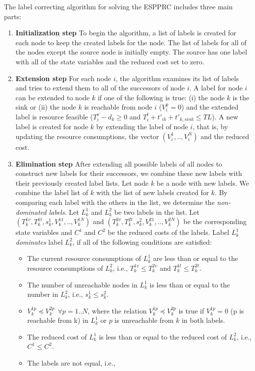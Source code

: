 The label correcting algorithm for solving the ESPPRC includes three main parts: 
\begin{enumerate}
\item {\bf Initialization step} To begin the algorithm, a list of labels is created 
  for each node to keep the created labels for the node. The list of  labels for all of the 
  nodes except the source node is initially empty. The source has one label with 
  all of the state variables and the reduced cost set to zero.
\item {\bf Extension step} For each node $i$, the algorithm examines its list of labels
  and tries to extend them to all of the successors of node $i$. A label for node $i$ can be
  extended to node $k$ if one of the following is true: (i) the node $k$ is the sink or (ii) 
  the node $k$ is reachable from node $i$ ($V_i^k=0$) and the extended label is resource 
  feasible ($T_i^v-d_k\geq 0$ and $T_i^{t}+t'_{ik}+t'_{k,sink}\leq TL$). A new label is
  created for node $k$ by extending the label of node $i$, that is, by updating the resource 
  consumptions, the vector $(V_i^1,..,V_i^N)$ and the reduced cost. 
\item {\bf Elimination step } After extending all possible labels of all nodes to 
  construct new labels for their successors, we combine these new labels  
  with their previously created label lists. Let node $k$ be a node with new labels. 
  We combine the label list of $k$ with the list of new labels created for $k$. By comparing each 
  label with the others in the list, we determine the {\em non-dominated labels}. 
  Let $L_k^1$ and $L_k^{2}$ be two labels in the list.  Let 
  $(T_k^{1v},T_k^{1t},s_k^1,V_k^{11},..,V_k^{1N})$ and 
  $(T_k^{2v},T_k^{2t},s_k^2,V_k^{21},..,V_k^{2N})$  be the corresponding state variables 
  and $C^1$ and $C^{2}$ be the reduced costs of the labels. Label $L_k^1$ {\em  dominates} label
  $L_k^{2}$, if all of the following conditions are satisfied:
  \begin{itemize}
  \item The current resource consumptions of $L_k^1$ are less than or equal to the resource consumptions
    of $L_k^{2}$, i.e., $T_k^{1v}\leq T_k^{2v}$ and $T_k^{1t}\leq T_k^{2t}$.
  \item The number of unreachable nodes in $L_k^1$ is less than or equal to the number in $L_k^{2}$, i.e.,
    $s_k^1\leq s_k^2$.
  \item $V_k^{1p}\preccurlyeq V_k^{2p} \ \ \forall p=1..N$, where the relation
    $V_k^{1p}\preccurlyeq V_k^{2p}$ is true if $V_k^{1p}=0$ (p is reachable from k) in $L_k^{1}$ 
    or $p$ is unreachable from $k$ in both labels.
  \item The reduced cost of $L_k^1$ is less than or equal to the reduced cost of $L_k^{2}$, i.e.,
    $C^1 \leq C^{2}$.
  \item The labels are not equal, i.e.,


\end{itemize}
\end{enumerate}
